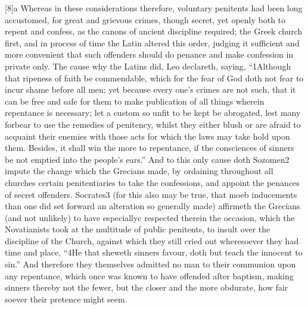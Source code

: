 [8]a Whereas in these considerations therefore, voluntary penitents had been long accustomed, for great and grievous crimes, though secret, yet openly both to repent and confess, as the canons of ancient discipline required; the Greek church first, and in process of time the Latin altered this order, judging it sufficient and more convenient that such offenders should do penance and make confession in private only. The cause why the Latins did, Leo declareth, saying,  “1Although that ripeness of faith be commendable, which for the fear of God doth not fear to incur shame before all men; yet because every one’s crimes are not such, that it can be free and safe for them to make publication of all things wherein repentance is necessary; let a custom so unfit to be kept be abrogated, lest many forbear to use the remedies of penitency, whilst they either blush or are afraid to acquaint their enemies with those acts for which the laws may take hold upon them. Besides, it shall win the more to repentance, if the consciences of sinners be not emptied into the people’s ears.” And to this only cause doth Sozomen2 impute the change which the Grecians made, by ordaining throughout all churches certain penitentiaries to take the confessions, and appoint the penances of secret offenders. Socrates3 (for this also may be true, that moeb inducements than one did set forward an alteration so generally made) affirmeth the Grecians (and not unlikely) to have especiallyc respected therein the occasion, which the Novatianists took at the multitude of public penitents, to insult over the discipline of the Church, against which they still cried out wheresoever they had time and place, “4He that sheweth sinners favour, doth but teach the innocent to  sin.” And therefore they themselves admitted no man to their communion upon any repentance, which once was known to have offended after baptism, making sinners thereby not the fewer, but the closer and the more obdurate, how fair soever their pretence might seem.

